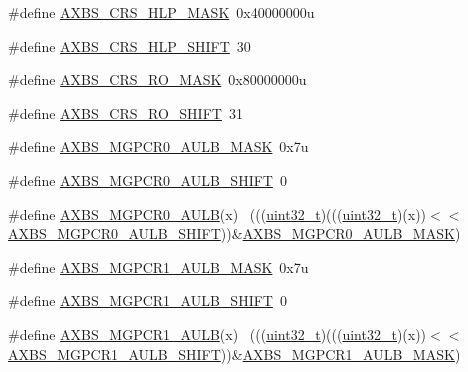 \begin{DoxyCompactItemize}
\item 
\#define \hyperlink{group___a_x_b_s___register___masks_gab93f8320945abd915c31020d4d147d33}{A\+X\+B\+S\+\_\+\+C\+R\+S\+\_\+\+H\+L\+P\+\_\+\+M\+A\+SK}~0x40000000u
\item 
\#define \hyperlink{group___a_x_b_s___register___masks_ga6cf361c996f63fd5cc169c352971bcd2}{A\+X\+B\+S\+\_\+\+C\+R\+S\+\_\+\+H\+L\+P\+\_\+\+S\+H\+I\+FT}~30
\item 
\#define \hyperlink{group___a_x_b_s___register___masks_gac511a1f4f6590cd86da388390b2993b5}{A\+X\+B\+S\+\_\+\+C\+R\+S\+\_\+\+R\+O\+\_\+\+M\+A\+SK}~0x80000000u
\item 
\#define \hyperlink{group___a_x_b_s___register___masks_ga51572e77d4fe6c519be097a8e6324331}{A\+X\+B\+S\+\_\+\+C\+R\+S\+\_\+\+R\+O\+\_\+\+S\+H\+I\+FT}~31
\item 
\#define \hyperlink{group___a_x_b_s___register___masks_ga161e38235a1d3154067e078e559202fd}{A\+X\+B\+S\+\_\+\+M\+G\+P\+C\+R0\+\_\+\+A\+U\+L\+B\+\_\+\+M\+A\+SK}~0x7u
\item 
\#define \hyperlink{group___a_x_b_s___register___masks_ga2c00c30d63906c765a6df81778e2fb4f}{A\+X\+B\+S\+\_\+\+M\+G\+P\+C\+R0\+\_\+\+A\+U\+L\+B\+\_\+\+S\+H\+I\+FT}~0
\item 
\#define \hyperlink{group___a_x_b_s___register___masks_ga934e66d76e8d9cf8177705cadff67976}{A\+X\+B\+S\+\_\+\+M\+G\+P\+C\+R0\+\_\+\+A\+U\+LB}(x)                                        ~(((\hyperlink{_p_e___types_8h_a33594304e786b158f3fb30289278f5af}{uint32\+\_\+t})(((\hyperlink{_p_e___types_8h_a33594304e786b158f3fb30289278f5af}{uint32\+\_\+t})(x))$<$$<$\hyperlink{group___a_x_b_s___register___masks_ga2c00c30d63906c765a6df81778e2fb4f}{A\+X\+B\+S\+\_\+\+M\+G\+P\+C\+R0\+\_\+\+A\+U\+L\+B\+\_\+\+S\+H\+I\+FT}))\&\hyperlink{group___a_x_b_s___register___masks_ga161e38235a1d3154067e078e559202fd}{A\+X\+B\+S\+\_\+\+M\+G\+P\+C\+R0\+\_\+\+A\+U\+L\+B\+\_\+\+M\+A\+SK})
\item 
\#define \hyperlink{group___a_x_b_s___register___masks_gaefd2ffd8d80f4eb9fd14f3c5a3a7b629}{A\+X\+B\+S\+\_\+\+M\+G\+P\+C\+R1\+\_\+\+A\+U\+L\+B\+\_\+\+M\+A\+SK}~0x7u
\item 
\#define \hyperlink{group___a_x_b_s___register___masks_gab45b6c2302bbf061fd1c43d436659bd7}{A\+X\+B\+S\+\_\+\+M\+G\+P\+C\+R1\+\_\+\+A\+U\+L\+B\+\_\+\+S\+H\+I\+FT}~0
\item 
\#define \hyperlink{group___a_x_b_s___register___masks_gaec7d467e7988f6765f7d0c5b9fd9f362}{A\+X\+B\+S\+\_\+\+M\+G\+P\+C\+R1\+\_\+\+A\+U\+LB}(x)                                        ~(((\hyperlink{_p_e___types_8h_a33594304e786b158f3fb30289278f5af}{uint32\+\_\+t})(((\hyperlink{_p_e___types_8h_a33594304e786b158f3fb30289278f5af}{uint32\+\_\+t})(x))$<$$<$\hyperlink{group___a_x_b_s___register___masks_gab45b6c2302bbf061fd1c43d436659bd7}{A\+X\+B\+S\+\_\+\+M\+G\+P\+C\+R1\+\_\+\+A\+U\+L\+B\+\_\+\+S\+H\+I\+FT}))\&\hyperlink{group___a_x_b_s___register___masks_gaefd2ffd8d80f4eb9fd14f3c5a3a7b629}{A\+X\+B\+S\+\_\+\+M\+G\+P\+C\+R1\+\_\+\+A\+U\+L\+B\+\_\+\+M\+A\+SK})

\end{DoxyCompactItemize}
